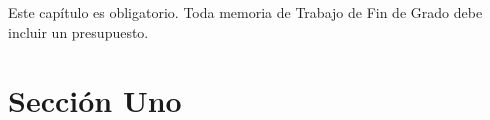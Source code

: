 

Este capítulo es obligatorio.
Toda memoria de Trabajo de Fin de Grado debe incluir un presupuesto.

\section{Sección Uno}
\label{7:sec:1}





